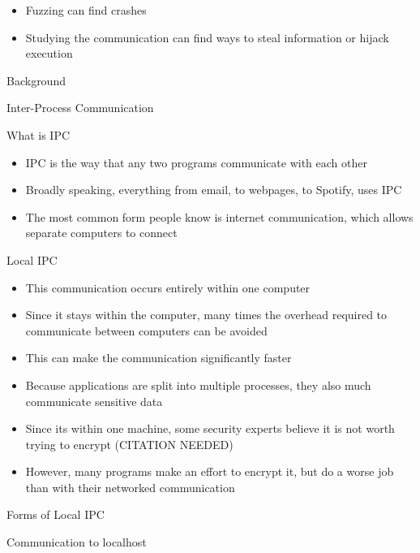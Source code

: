 \documentclass{article}
\begin{document}
\begin{outline}
\begin{itemize}
\begin{itemize}
            \item Fuzzing can find crashes
            \item Studying the communication can find ways to steal information or hijack execution
        \end{itemize}
    \end{itemize}
    \item {Background}
    \begin{outline}
        \item {Inter-Process Communication}
        \begin{outline}
            \item What is IPC
            \begin{itemize}
                \item IPC is the way that any two programs communicate with each other
                \item Broadly speaking, everything from email, to webpages, to Spotify, uses IPC
                \item The most common form people know is internet communication, which allows separate computers to connect
            \end{itemize}
            \item Local IPC
            \begin{itemize}
                \item This communication occurs entirely within one computer
                \item Since it stays within the computer, many times the overhead required to communicate between computers can be avoided
                \item This can make the communication significantly faster
                \item Because applications are split into multiple processes, they also much communicate sensitive data
                \item Since its within one machine, some security experts believe it is not worth trying to encrypt (CITATION NEEDED)
                \item However, many programs make an effort to encrypt it, but do a worse job than with their networked communication
            \end{itemize}
            \item Forms of Local IPC
            \begin{outline}
                \item Communication to localhost

\end{outline}
\end{outline}
\end{outline}
\end{outline}
\end{document}
